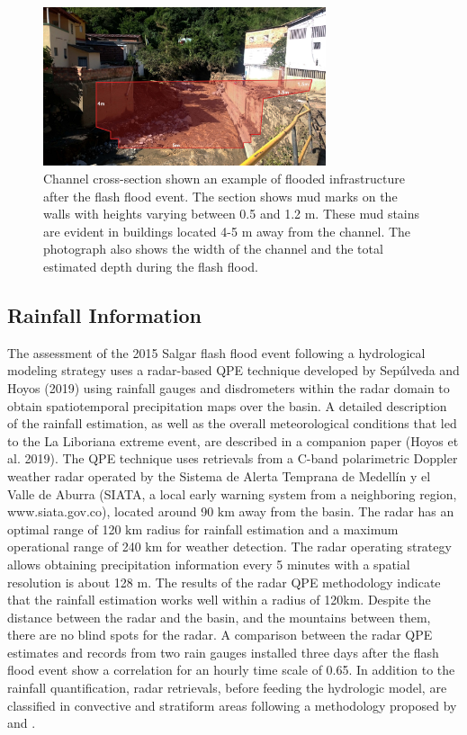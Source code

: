 \documentclass[hess, manuscript]{copernicus}
\begin{document}
\begin{figure}[t]
\centering
    \includegraphics[width=8.3cm]{Figures/Salgar_SeccionAguasAbajo.jpg}
    \caption{Channel cross-section shown an example of flooded infrastructure after the flash flood event. The section shows mud marks on the walls with heights varying between 0.5 and 1.2 m. These mud stains are evident in buildings located 4-5 m away from the channel. The photograph also shows the width of the channel and the total estimated depth during the flash flood.}
    \label{fig:Seccion}
\end{figure}

\subsection{Rainfall Information}

The assessment of the 2015 Salgar flash flood event following a hydrological modeling strategy uses a radar-based QPE technique developed by Sepúlveda and Hoyos (2019) using rainfall gauges and disdrometers within the radar domain to obtain spatiotemporal precipitation maps over the basin. A detailed description of the rainfall estimation, as well as the overall meteorological conditions that led to the La Liboriana extreme event, are described in a companion paper (Hoyos et al. 2019). The QPE technique uses retrievals from a C-band polarimetric Doppler weather radar operated by the Sistema de Alerta Temprana de Medellín y el Valle de Aburra (SIATA, a local early warning system from a neighboring region,  www.siata.gov.co), located around 90 $\text{km}$ away from the basin. The radar has an optimal range of 120 $\text{km}$ radius for rainfall estimation and a maximum operational range of 240 $\text{km}$ for weather detection. The radar operating strategy allows obtaining precipitation information every 5 minutes with a spatial resolution is about 128 $\text{m}$. The results of the radar QPE methodology indicate that the rainfall estimation works well within a radius of 120km. Despite the distance between the radar and the basin, and the mountains between them, there are no blind spots for the radar. A  comparison between the radar QPE estimates and records from two rain gauges installed three days after the flash flood event show a correlation for an hourly time scale of 0.65. In addition to the rainfall quantification, radar retrievals, before feeding the hydrologic model,  are classified in convective and stratiform areas following a methodology proposed by \citet{Houze2015} and \citet{Steiner1995}.\\
\end{document}
